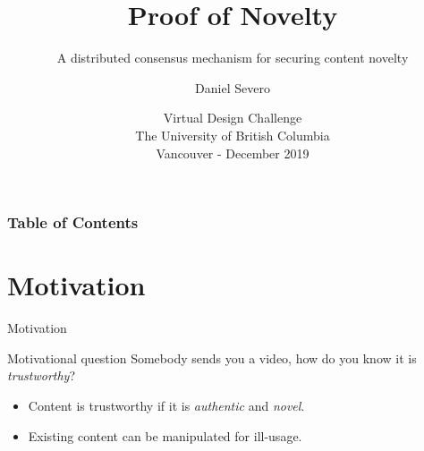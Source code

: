 \documentclass{beamer}
\title[Proof of Novelty] %
{Proof of Novelty}
\subtitle{A distributed consensus mechanism for securing content novelty}
\author[\href{https://dsevero.com}{dsevero.com}] %
{Daniel Severo}
\institute %
{Independent Scientist}
\date[VDC 2019] %
{Virtual Design Challenge \\ The University of British Columbia \\ Vancouver - December 2019}
\begin{document}
\frame{\titlepage}


\begin{frame}
\frametitle{Table of Contents}
\tableofcontents
\end{frame}


\section{Motivation}
\begin{frame}{Motivation}
    \begin{block}{Motivational question}
        Somebody sends you a video, how do you know it is \emph{trustworthy}?
    \end{block}\pause
    
    \vfill
    
    \begin{itemize}
        \item Content is trustworthy if it is \emph{authentic} and \emph{novel}.\pause
        \item Existing content can be manipulated for ill-usage.
    \end{itemize}
    
    \vfill
    
    \begin{figure}
        \centering
    \end{figure}
    
\end{frame}

\end{document}
